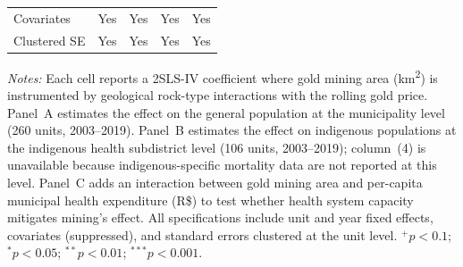 \begin{table}[htbp]
\begin{tabular}{l*{4}{c}}
Covariates & Yes & Yes & Yes & Yes \\
Clustered SE & Yes & Yes & Yes & Yes \\
\bottomrule
\end{tabular}
\begin{tablenotes}[flushleft]
\footnotesize
\item \textit{Notes:} Each cell reports a 2SLS-IV coefficient where gold mining area (km\textsuperscript{2}) is instrumented by geological rock-type interactions with the rolling gold price. Panel~A estimates the effect on the general population at the municipality level (260 units, 2003--2019). Panel~B estimates the effect on indigenous populations at the indigenous health subdistrict level (106 units, 2003--2019); column~(4) is unavailable because indigenous-specific mortality data are not reported at this level. Panel~C adds an interaction between gold mining area and per-capita municipal health expenditure (R\$) to test whether health system capacity mitigates mining's effect. All specifications include unit and year fixed effects, covariates (suppressed), and standard errors clustered at the unit level. $^{+}p<0.1$; $^{*}p<0.05$; $^{**}p<0.01$; $^{***}p<0.001$.
\end{tablenotes}
\end{table}
